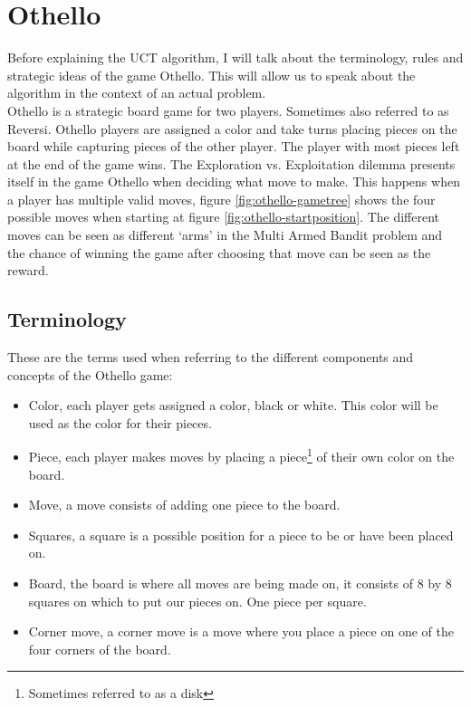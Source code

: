 \documentclass[
11pt, %
english, %
singlespacing, %
headsepline, %
]{MastersDoctoralThesis} %
\begin{document}
\section{Othello}
Before explaining the UCT algorithm, I will talk about the terminology, rules and strategic ideas of the game Othello. This will allow us to speak about the algorithm in the context of an actual problem.\\

Othello is a strategic board game for two players. Sometimes also referred to as Reversi. Othello players are assigned a color and take turns placing pieces on the board while capturing pieces of the other player. The player with most pieces left at the end of the game wins. The Exploration vs. Exploitation dilemma presents itself in the game Othello when deciding what move to make. This happens when a player has multiple valid moves, figure \ref{fig:othello-gametree} shows the four possible moves when starting at figure \ref{fig:othello-startposition}. The different moves can be seen as different `arms' in the Multi Armed Bandit problem and the chance of winning the game after choosing that move can be seen as the reward.\\
\subsection{Terminology}
These are the terms used when referring to the different components and concepts of the Othello game:
\begin{itemize}
	\item Color, each player gets assigned a color, black or white. This color will be used as the color for their pieces.
	\item Piece, each player makes moves by placing a piece\footnote{Sometimes referred to as a disk} of their own color on the board.
	\item Move, a move consists of adding one piece to the board.
	\item Squares, a square is a possible position for a piece to be or have been placed on. 
	\item Board, the board is where all moves are being made on, it consists of 8 by 8 squares on which to put our pieces on. One piece per square.
	\item Corner move, a corner move is a move where you place a piece on one of the four corners of the board.

\end{itemize}
\end{document}
